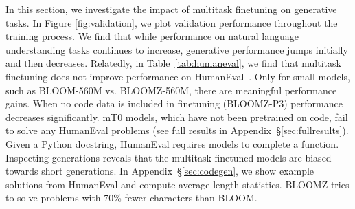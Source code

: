 \documentclass[11pt]{article}
\begin{document}
In this section, we investigate the impact of multitask finetuning on generative tasks. In Figure \ref{fig:validation}, we plot validation performance throughout the training process. We find that while performance on natural language understanding tasks continues to increase, generative performance jumps initially and then decreases. Relatedly, in Table~\ref{tab:humaneval}, we find that multitask finetuning does not improve performance on HumanEval~\cite{chen2021evaluating}. Only for small models, such as BLOOM-560M vs. BLOOMZ-560M, there are meaningful performance gains. When no code data is included in finetuning (BLOOMZ-P3) performance decreases significantly. mT0 models, which have not been pretrained on code, fail to solve any HumanEval problems (see full results in Appendix~\S\ref{sec:fullresults}). Given a Python docstring, HumanEval requires models to complete a function. Inspecting generations reveals that the multitask finetuned models are biased towards short generations. In Appendix~\S\ref{sec:codegen}, we show example solutions from HumanEval and compute average length statistics. BLOOMZ tries to solve problems with 70\% fewer characters than BLOOM.
\end{document}
